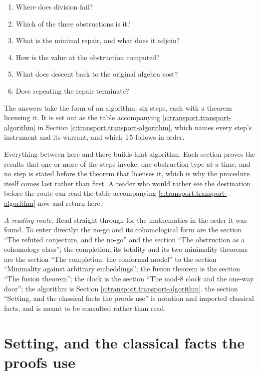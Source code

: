 \documentclass[11pt]{article}
\theoremstyle{definition}
\theoremstyle{plain}
\begin{document}
   
\begin{enumerate}
  
\item Where does division fail?
\item Which of the three obstructions is it?
\item What is the minimal repair, and what does it adjoin?
\item How is the value at the obstruction computed?
\item What does descent back to the original algebra cost?
\item Does repeating the repair terminate?
\end{enumerate}
 \noindent The answers take the form of an algorithm: six steps, each with a theorem licensing it. It is set out as the table accompanying \ref{c:transport.transport-algorithm} in Section \ref{c:transport.transport-algorithm}, which names every step's instrument and its warrant, and which T5 follows in order.

Everything between here and there builds that algorithm. Each section proves the results that one or more of the steps invoke, one obstruction type at a time, and no step is stated before the theorem that licenses it, which is why the procedure itself comes last rather than first. A reader who would rather see the destination before the route can read the table accompanying \ref{c:transport.transport-algorithm} now and return here.

\emph{A reading route.} Read straight through for the mathematics in the order it was found. To enter directly: the no-go and its cohomological form are the section ``The refuted conjecture, and the no-go'' and the section ``The obstruction as a cohomology class''; the completion, its totality and its two minimality theorems are the section ``The completion: the conformal model'' to the section ``Minimality against arbitrary embeddings''; the fusion theorem is the section ``The fusion theorem''; the clock is the section ``The mod-8 clock and the one-way door''; the algorithm is Section \ref{c:transport.transport-algorithm}. the section ``Setting, and the classical facts the proofs use'' is notation and imported classical facts, and is meant to be consulted rather than read.

\section{Setting, and the classical facts the proofs use}
\end{document}
